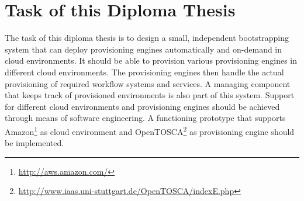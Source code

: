 \section{Task of this Diploma Thesis}

The task of this diploma thesis is to design a small, independent bootstrapping system that can deploy provisioning engines automatically and on-demand in cloud environments.
It should be able to provision various provisioning engines in different cloud environments.
The provisioning engines then handle the actual provisioning of required workflow systems and services.
A managing component that keeps track of provisioned environments is also part of this system.
Support for different cloud environments and provisioning engines should be achieved through means of software engineering.
A functioning prototype that supports Amazon\footnote{\url{http://aws.amazon.com/}} as cloud environment and OpenTOSCA\footnote{\url{http://www.iaas.uni-stuttgart.de/OpenTOSCA/indexE.php}} as provisioning engine should be implemented.
